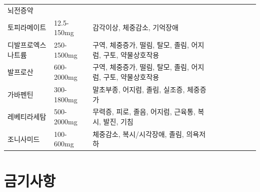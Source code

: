 \documentclass[]{book}
\begin{document}
\begin{longtable}{lllllllll}
뇌전증약 &  & \\
\addlinespace
토피라메이트 & 12.5-150mg & 감각이상, 체중감소, 기억장애\\
디발프로엑스나트륨 & 250-1500mg & 구역, 체중증가, 떨림, 탈모, 졸림, 어지럼, 구토, 약물상호작용\\
발프로산 & 600-2000mg & 구역, 체중증가, 떨림, 탈모, 졸림, 어지럼, 구토, 약물상호작용\\
가바펜틴 & 300-1800mg & 말초부종, 어지럼, 졸림, 실조증, 체중증가\\
레베티라세탐 & 500-2000mg & 무력증, 피로, 졸음, 어지럼, 근육통, 복시, 발진, 기침\\
\addlinespace
조니사미드 & 100-600mg & 체중감소, 복시/시각장애, 졸림, 의욕저하\\
\bottomrule
\end{longtable}

\hypertarget{section-23}{%
\section{금기사항}\label{section-23}}
\end{document}
